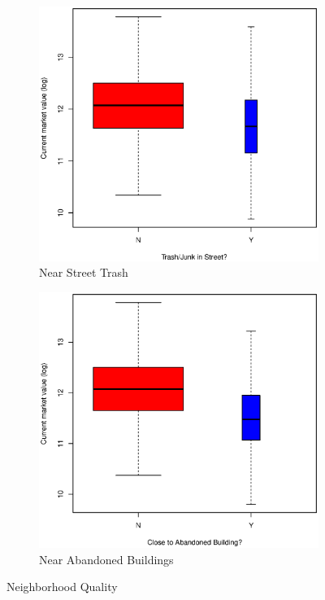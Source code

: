 \documentclass[11pt, fleqn]{article}
\begin{document}
\begin{figure}
  \centering
  \begin{subfigure}[b]{0.49\textwidth}
    \includegraphics[width=\textwidth]{ejunk.eps}
    \caption{Near Street Trash}
    \label{fig:ejunk}
  \end{subfigure}
  \hfill
  \begin{subfigure}[b]{0.49\textwidth}
    \includegraphics[width=\textwidth]{eaban.eps}
    \caption{Near Abandoned Buildings}
    \label{fig:eaban}
  \end{subfigure}
  \caption{Neighborhood Quality}
\end{figure}
\end{document}
